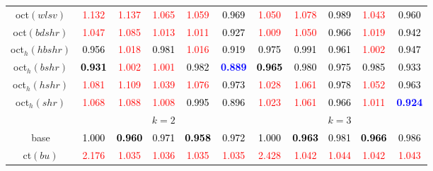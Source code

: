 \begin{tabular}[t]{c|>{}cccc>{}c|ccccc}
oct$(wlsv)$ & \textcolor{red}{1.132} & \textcolor{red}{1.137} & \textcolor{red}{1.065} & \textcolor{red}{1.059} & \textcolor{black}{0.969} & \textcolor{red}{1.050} & \textcolor{red}{1.078} & \textcolor{black}{0.989} & \textcolor{red}{1.043} & \textcolor{black}{0.960}\\
oct$(bdshr)$ & \textcolor{red}{1.047} & \textcolor{red}{1.085} & \textcolor{red}{1.013} & \textcolor{red}{1.011} & \textcolor{black}{0.927} & \textcolor{red}{1.009} & \textcolor{red}{1.050} & \textcolor{black}{0.966} & \textcolor{red}{1.019} & \textcolor{black}{0.942}\\
oct$_h(hbshr)$ & \textcolor{black}{0.956} & \textcolor{red}{1.018} & \textcolor{black}{0.981} & \textcolor{red}{1.016} & \textcolor{black}{0.919} & \textcolor{black}{0.975} & \textcolor{black}{0.991} & \textcolor{black}{0.961} & \textcolor{red}{1.002} & \textcolor{black}{0.947}\\
oct$_h(bshr)$ & \textcolor{black}{\textbf{0.931}} & \textcolor{red}{1.002} & \textcolor{red}{1.001} & \textcolor{black}{0.982} & \textcolor{blue}{\textbf{0.889}} & \textcolor{black}{\textbf{0.965}} & \textcolor{black}{0.980} & \textcolor{black}{0.975} & \textcolor{black}{0.985} & \textcolor{black}{0.933}\\
oct$_h(hshr)$ & \textcolor{red}{1.081} & \textcolor{red}{1.109} & \textcolor{red}{1.039} & \textcolor{red}{1.076} & \textcolor{black}{0.973} & \textcolor{red}{1.028} & \textcolor{red}{1.061} & \textcolor{black}{0.978} & \textcolor{red}{1.052} & \textcolor{black}{0.963}\\
oct$_h(shr)$ & \textcolor{red}{1.068} & \textcolor{red}{1.088} & \textcolor{red}{1.008} & \textcolor{black}{0.995} & \textcolor{black}{0.896} & \textcolor{red}{1.023} & \textcolor{red}{1.061} & \textcolor{black}{0.966} & \textcolor{red}{1.011} & \textcolor{blue}{\textbf{0.924}}\\
\addlinespace[0.3em]
\multicolumn{1}{c}{} & \multicolumn{5}{c}{\textbf{$k = 2$}} & \multicolumn{5}{c}{\textbf{$k = 3$}}\\
base & \textcolor{black}{1.000} & \textcolor{black}{\textbf{0.960}} & \textcolor{black}{0.971} & \textcolor{black}{\textbf{0.958}} & \textcolor{black}{0.972} & \textcolor{black}{1.000} & \textcolor{black}{\textbf{0.963}} & \textcolor{black}{0.981} & \textcolor{black}{\textbf{0.966}} & \textcolor{black}{0.986}\\
ct$(bu)$ & \textcolor{red}{2.176} & \textcolor{red}{1.035} & \textcolor{red}{1.036} & \textcolor{red}{1.035} & \textcolor{red}{1.035} & \textcolor{red}{2.428} & \textcolor{red}{1.042} & \textcolor{red}{1.044} & \textcolor{red}{1.042} & \textcolor{red}{1.043}\\

\end{tabular}
